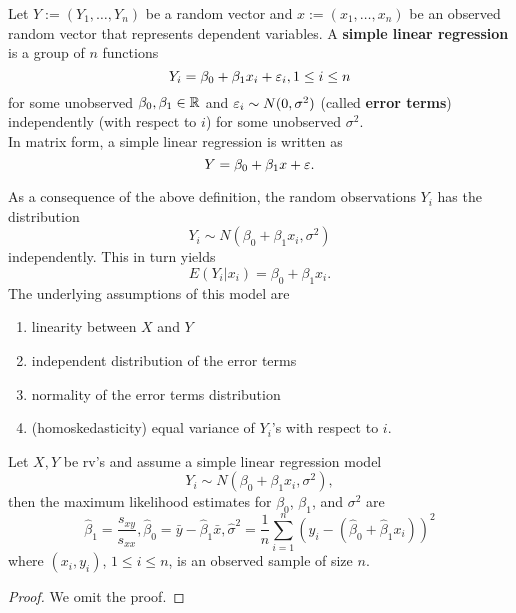 \documentclass[11pt,fleqn]{book} %
\begin{document}
\begin{definition} \label{def:119}
Let \(Y := (Y_1, \ldots, Y_n)\) be a random vector and \(x := (x_1, \ldots, x_n)\) be an observed random vector that represents dependent variables. A \textbf{simple linear regression} is a group of \(n\) functions
\[
Y_i = \beta_0 + \beta_1x_i + \varepsilon_i, 1 \leq i \leq n
\]
for some unobserved \(\beta_0, \beta_1 \in \mathbb{R}\) and \(\varepsilon_i \sim N(0, \sigma^2)\) (called \textbf{error terms}) independently (with respect to \(i\)) for some unobserved \(\sigma^2\). \\
\indent In matrix form, a simple linear regression is written as
\[
Y = \beta_0 + \beta_1x + \varepsilon.
\]
\end{definition}

\begin{remark} \label{rmk:1110}
As a consequence of the above definition, the random observations \(Y_i\) has the distribution
\[
Y_i \sim N(\beta_0 + \beta_1x_i, \sigma^2)
\]
independently. This in turn yields
\[
E(Y_i|x_i) = \beta_0 + \beta_1x_i.
\]
\indent The underlying assumptions of this model are
\begin{enumerate}
\item linearity between \(X\) and \(Y\)
\item independent distribution of the error terms
\item normality of the error terms distribution
\item (homoskedasticity) equal variance of \(Y_i\)'s with respect to \(i\).
\end{enumerate}
\end{remark}

\begin{theorem} \label{thm:1111}
Let \(X, Y\) be rv's and assume a simple linear regression model
\[
Y_i \sim N(\beta_0 + \beta_1x_i, \sigma^2),
\]
then the maximum likelihood estimates for \(\beta_0\), \(\beta_1\), and \(\sigma^2\) are
\[
\hat{\beta}_1 = \frac{s_{xy}}{s_{xx}},
\hat{\beta}_0 = \bar{y} - \hat{\beta}_1\bar{x},
\hat{\sigma}^2 = \frac1n\sum_{i=1}^n(y_i - (\hat{\beta}_0 + \hat{\beta}_1x_i))^2
\]
where \((x_i, y_i)\), \(1 \leq i \leq n\), is an observed sample of size \(n\).
\end{theorem}
\begin{proof} We omit the proof.\end{proof}
\end{document}
